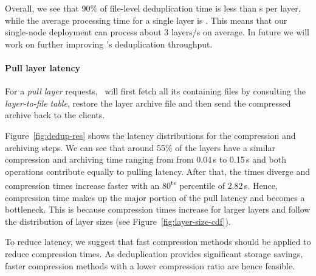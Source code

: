 %
Overall, we see that 90\% of file-level deduplication time is less than s
per layer, while the average processing time for a single layer is .
%
This means that our single-node deployment can process about 3 layers/s on average.
%
In future we will work on further improving \sysname's deduplication throughput.
%
%

\paragraph{Pull layer latency} 

For a \emph{pull layer} requests, \sysname\ will first fetch 
all its containing files by consulting the \emph{layer-to-file table}, 
restore the layer archive file and then send the compressed archive back
to the clients.

Figure~\ref{fig:dedup-res} shows the latency distributions for the compression
and archiving steps.
%
%
%
We can see that around 55\% of the layers have a similar compression and archiving
time ranging from from 0.04\,s to 0.15\,s and both operations contribute equally
to pulling latency.
%
%
After that, the times diverge and compression times increase faster with an
80\textsuperscript{ts} percentile of 2.82\,s.
%
Hence, compression time makes up the major portion of the pull latency and becomes a
bottleneck.
%
This is because compression times increase for larger layers and follow the distribution
of layer sizes (see Figure~\ref{fig:layer-size-cdf}).
%

%
To reduce latency, we suggest that fast compression methods should be applied to reduce
compression times. As deduplication provides significant storage savings, faster compression
methods with a lower compression ratio are hence feasible.

%

